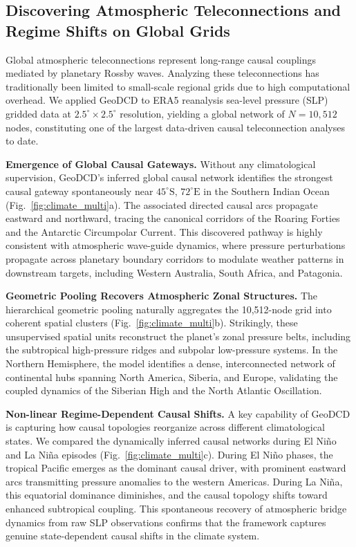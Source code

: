 \documentclass{article}
\begin{document}
\subsection{Discovering Atmospheric Teleconnections and Regime Shifts on Global Grids}
Global atmospheric teleconnections represent long-range causal couplings mediated by planetary Rossby waves. Analyzing these teleconnections has traditionally been limited to small-scale regional grids due to high computational overhead. We applied GeoDCD to ERA5 reanalysis sea-level pressure (SLP) gridded data at $2.5^\circ \times 2.5^\circ$ resolution, yielding a global network of $N=10{,}512$ nodes, constituting one of the largest data-driven causal teleconnection analyses to date.

\textbf{Emergence of Global Causal Gateways.}
Without any climatological supervision, GeoDCD's inferred global causal network identifies the strongest causal gateway spontaneously near $45^\circ\text{S}$, $72^\circ\text{E}$ in the Southern Indian Ocean (Fig.~\ref{fig:climate_multi}a). The associated directed causal arcs propagate eastward and northward, tracing the canonical corridors of the Roaring Forties and the Antarctic Circumpolar Current. This discovered pathway is highly consistent with atmospheric wave-guide dynamics, where pressure perturbations propagate across planetary boundary corridors to modulate weather patterns in downstream targets, including Western Australia, South Africa, and Patagonia.

\textbf{Geometric Pooling Recovers Atmospheric Zonal Structures.}
The hierarchical geometric pooling naturally aggregates the 10,512-node grid into coherent spatial clusters (Fig.~\ref{fig:climate_multi}b). Strikingly, these unsupervised spatial units reconstruct the planet's zonal pressure belts, including the subtropical high-pressure ridges and subpolar low-pressure systems. In the Northern Hemisphere, the model identifies a dense, interconnected network of continental hubs spanning North America, Siberia, and Europe, validating the coupled dynamics of the Siberian High and the North Atlantic Oscillation.

\textbf{Non-linear Regime-Dependent Causal Shifts.}
A key capability of GeoDCD is capturing how causal topologies reorganize across different climatological states. We compared the dynamically inferred causal networks during El Niño and La Niña episodes (Fig.~\ref{fig:climate_multi}c). During El Niño phases, the tropical Pacific emerges as the dominant causal driver, with prominent eastward arcs transmitting pressure anomalies to the western Americas. During La Niña, this equatorial dominance diminishes, and the causal topology shifts toward enhanced subtropical coupling. This spontaneous recovery of atmospheric bridge dynamics from raw SLP observations confirms that the framework captures genuine state-dependent causal shifts in the climate system.
\end{document}

